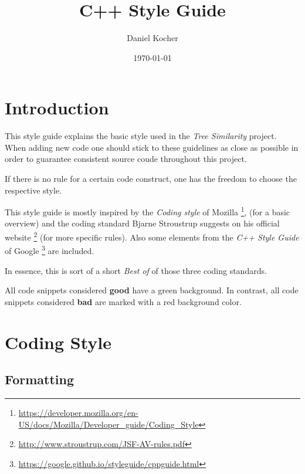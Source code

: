 \documentclass[onecolumn, a4paper, 11pt]{article}%
\begin{document}
%


\title{C++ Style Guide}%
\date{\today}%
\author{Daniel Kocher}%

\maketitle%
\clearpage%


\section{\label{sec:introduction}Introduction}

This style guide explains the basic style used in the \emph{Tree Similarity}
project. When adding new code one should stick to these guidelines as close as
possible in order to guarantee consistent source coude throughout this project.

If there is no rule for a certain code construct, one has the freedom to choose
the respective style.

This style guide is mostly inspired by the \emph{Coding style} of Mozilla
\footnote{\url{https://developer.mozilla.org/en-US/docs/Mozilla/Developer_guide/Coding_Style}},
(for a basic overview) and the coding standard Bjarne Stroustrup suggests on his
official website
\footnote{\url{http://www.stroustrup.com/JSF-AV-rules.pdf}} (for more specific
rules). Also some elements from the \emph{C++ Style Guide} of Google
\footnote{\url{https://google.github.io/styleguide/cppguide.html}} are included.

In essence, this is sort of a short \emph{Best of} of those three coding standards.

All code snippets considered {\bfseries\color{darkgreen}good} have a green
background. In contrast, all code snippets considered {\bfseries\color{alizarin}bad}
are marked with a red background color.

\section{\label{sec:coding-style}Coding Style}%

\subsection{\label{subsec:formatting}Formatting}%
\end{document}
